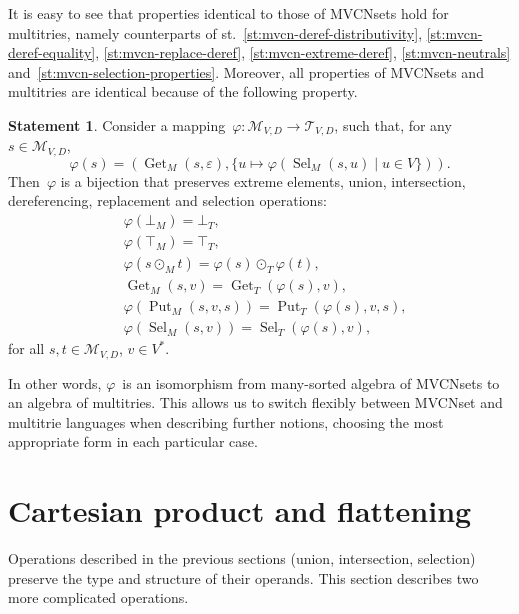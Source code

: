 \documentclass{article}
\theoremstyle{definition}
\newtheorem{St}{Statement}
\newcommand{\setcharmvcn}{M}
\newcommand{\setcharmt}{T}
\newcommand{\setsymbol}[3]{\mathcal{#1}_{#2,#3}}
\newcommand{\setmvcn}[2]{\setsymbol{\setcharmvcn}{#1}{#2}}
\newcommand{\setmt}[2]{\setsymbol{\setcharmt}{#1}{#2}}
\newcommand{\select}{\operatorname{Sel}}
\newcommand{\deref}{\operatorname{Get}}
\newcommand{\putval}{\operatorname{Put}}
\begin{document}
It is easy to see that properties identical to those of MVCNsets
hold for multitries, namely counterparts of
st.~\ref{st:mvcn-deref-distributivity},
\ref{st:mvcn-deref-equality},
\ref{st:mvcn-replace-deref},
\ref{st:mvcn-extreme-deref},
\ref{st:mvcn-neutrals}
and~\ref{st:mvcn-selection-properties}.
Moreover, all properties of MVCNsets and multitries are identical because
of the following property.

\begin{St}\label{st:isomorph}
Consider a mapping~$\varphi: \setmvcn{V}{D} \to \setmt{V}{D}$, such that,
for any~$s\in \setmvcn{V}{D}$,
\[
  \varphi(s) = (
    \deref_\setcharmvcn(s, \varepsilon) ,
    \{ u \mapsto \varphi(\select_\setcharmvcn(s, u) \mid u\in V \})
  ) .
\]
Then~$\varphi$ is a bijection that preserves
extreme elements, union, intersection, dereferencing, replacement and selection
operations:
\begin{eqnarray*}
  & \varphi(\bot_{\setcharmvcn}) = \bot_{\setcharmt}, \\
  & \varphi(\top_{\setcharmvcn}) = \top_{\setcharmt}, \\
  & \varphi(s \mathbin{\odot_{\setcharmvcn}} t) =
      \varphi(s) \mathbin{\odot_{\setcharmt}} \varphi(t) , \\
  & \deref_{\setcharmvcn}(s, v) =
      \deref_{\setcharmt}(\varphi(s), v) , \\
  & \varphi(\putval_{\setcharmvcn}(s, v, s)) =
      \putval_{\setcharmt}(\varphi(s), v, s) , \\
  & \varphi(\select_{\setcharmvcn}(s, v)) =
      \select_{\setcharmt}(\varphi(s), v) ,
\end{eqnarray*}
for all $s,t \in \setmvcn{V}{D}$, $v \in V^\ast$.
\end{St}

In other words, $\varphi$~is an isomorphism from many-sorted algebra of
MVCNsets to an algebra of multitries.
This allows us to switch flexibly between MVCNset and multitrie
languages when describing further notions, choosing the most
appropriate form in each particular case.



\section{Cartesian product and flattening}

Operations described in the previous sections (union, intersection, selection)
preserve the type and structure of their operands. This section describes two
more complicated operations.
\end{document}
